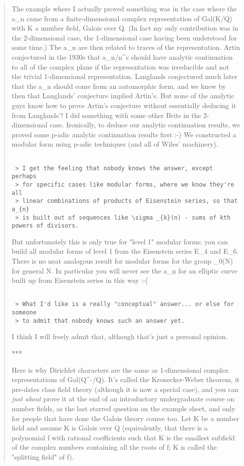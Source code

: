 \begin{quote}
 The example where I actually proved something was in the case
 where the a_{n} came from a finite-dimensional complex representation 
 of Gal(K/Q) with K a number field, Galois over Q.  (In fact my only 
 contribution was in the 2-dimensional case, the 1-dimensional case 
 having been understood for some time.)  The a_{n} are then related to
 traces of the representation.  Artin conjectured in the 1930s that
 \sum a_{n}/n^{s} 
 should have analytic continuation to all of the
 complex plane if the representation was irreducible and not the trivial
 1-dimensional representation.  Langlands conjectured much later that 
 the a_{n} should come from an automorphic form, and we knew by then 
 that Langlands' conjecture implied Artin's.  But none of the analytic 
 guys know how to prove Artin's conjecture without essentially deducing 
 it from Langlands'!  I did something with some other Brits in the 
 2-dimensional case. Ironically, to deduce our analytic continuation 
 results, we proved some p-adic analytic continuation results first :-) 
 We constructed a modular form using p-adic techniques (and all of 
 Wiles' machinery).


\begin{verbatim}

 > I get the feeling that nobody knows the answer, except perhaps
 > for specific cases like modular forms, where we know they're all
 > linear combinations of products of Eisenstein series, so that a_{n}
 > is built out of sequences like \sigma _{k}(n) - sums of kth powers of divisors.
\end{verbatim}
    

 But unfortunately this is only true for "level 1" modular forms: you
 can build all modular forms of level 1 from the Eisenstein series
 E_{4} and E_{6}. There is no neat analogous result for modular forms
 for the group \Gamma _{0}(N) for general N. In particular you will never
 see the a_{n} for an elliptic curve built up from Eisenstein series in this
 way :-(


\begin{verbatim}

 > What I'd like is a really "conceptual" answer... or else for someone
 > to admit that nobody knows such an answer yet.
\end{verbatim}
    

 I think I will freely admit that, although that's just a personal opinion.

 ***

 Here is why Dirichlet characters are the same as 1-dimensional complex
 representations of Gal(Q^{-}/Q). It's called the Kronecker-Weber
 theorem, it pre-dates class field theory (although it is now a special
 case), and you can \emph{just about} prove it at the end of an introductory
 undergraduate course on number fields, as the last starred question
 on the example sheet, and only for people that have done the Galois
 theory course too.  Let K be a number field and assume K is Galois
 over Q (equivalently, that there is a polynomial f with rational
 coefficients such that K is the smallest subfield of the complex
 numbers containing all the roots of f; K is called the "splitting 
 field" of f).


\end{quote}
